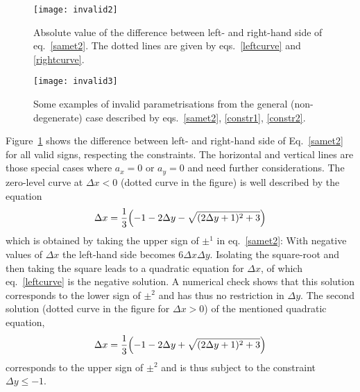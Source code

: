 \documentclass{article}
\begin{document}
%
\begin{figure}[ht]
  \centering
  \texttt{[image: invalid2]}%
  \caption{Absolute value of the difference between left- and right-hand side of
  eq.~\eqref{samet2}. The dotted lines are given by eqs.~\eqref{leftcurve} and
  \eqref{rightcurve}.}%
  \label{fig:invalid2}%
\end{figure}%
%
\begin{figure}[ht]
  \centering
  \texttt{[image: invalid3]}%
  \caption{Some examples of invalid parametrisations from the general
  (non-degenerate) case described by eqs.~\eqref{samet2}, \eqref{constr1},
  \eqref{constr2}.}%
  \label{fig:invalid3}%
\end{figure}%
%
Figure~\ref{fig:invalid2} shows the difference between left- and right-hand side
of Eq.~\eqref{samet2} for all valid signs, respecting the constraints. The
horizontal and vertical lines are those special cases where $a_x=0$ or $a_y=0$
and need further considerations. The zero-level curve at $\Delta x < 0$ (dotted
curve in the figure) is well described by the equation
%
\begin{equation}
  \label{leftcurve}
  \Delta x = \frac{1}{3}\Bigl(-1-2\Delta y - \sqrt{(2\Delta y+1)^2 + 3}\Bigr)
\end{equation}
%
which is obtained by taking the upper sign of $\pm^1$ in eq.~\eqref{samet2}:
With negative values of $\Delta x$ the left-hand side becomes $6\Delta x\Delta
y$. Isolating the square-root and then taking the square leads to a quadratic
equation for $\Delta x$, of which eq.~\eqref{leftcurve} is the negative
solution. A numerical check shows that this solution corresponds to the lower
sign of $\pm^2$ and has thus no restriction in $\Delta y$. The second solution
(dotted curve in the figure for $\Delta x>0$) of the mentioned quadratic
equation,
%
\begin{equation}
  \label{rightcurve}
  \Delta x = \frac{1}{3}\Bigl(-1-2\Delta y + \sqrt{(2\Delta y+1)^2 + 3}\Bigr)
\end{equation}
%
corresponds to the upper sign of $\pm^2$ and is thus subject to the constraint
\hbox{$\Delta y \leq -1$}.
\end{document}

